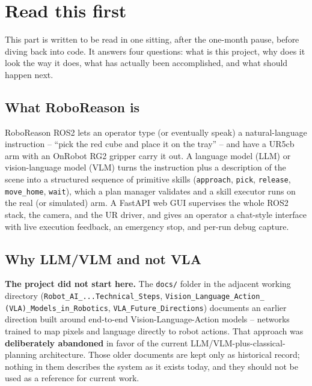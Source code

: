 \section*{Read this first}

This part is written to be read in one sitting, after the one-month pause,
before diving back into code. It answers four questions: what is this
project, why does it look the way it does, what has actually been
accomplished, and what should happen next.

\subsection*{What RoboReason is}

RoboReason ROS2 lets an operator type (or eventually speak) a natural-language
instruction -- ``pick the red cube and place it on the tray'' -- and have a
UR5cb arm with an OnRobot RG2 gripper carry it out. A language model (LLM) or
vision-language model (VLM) turns the instruction plus a description of the
scene into a structured sequence of primitive skills (\texttt{approach},
\texttt{pick}, \texttt{release}, \texttt{move\_home}, \texttt{wait}), which a
plan manager validates and a skill executor runs on the real (or simulated)
arm. A FastAPI web GUI supervises the whole ROS2 stack, the camera, and the
UR driver, and gives an operator a chat-style interface with live execution
feedback, an emergency stop, and per-run debug capture.

\subsection*{Why LLM/VLM and not VLA}

\textbf{The project did not start here.} The \texttt{docs/} folder in the
adjacent working directory
(\texttt{Robot\_AI\_...Technical\_Steps}, \texttt{Vision\_Language\_Action\_
(VLA)\_Models\_in\_Robotics}, \texttt{VLA\_Future\_Directions}) documents an
earlier direction built around end-to-end Vision-Language-Action models --
networks trained to map pixels and language directly to robot actions. That
approach was \textbf{deliberately abandoned} in favor of the current
LLM/VLM-plus-classical-planning architecture. Those older documents are kept
only as historical record; nothing in them describes the system as it exists
today, and they should not be used as a reference for current work.

